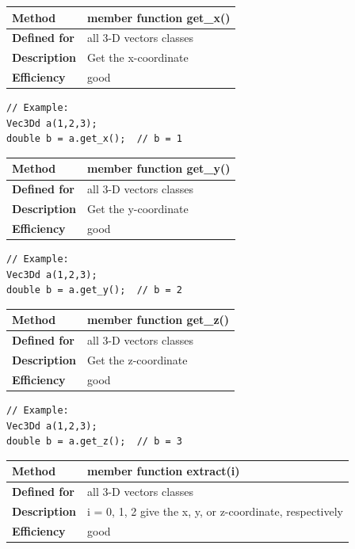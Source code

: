 \documentclass[11pt,a4paper,oneside,openright]{report}
\newcommand{\vspacesmall}{\vspace{3mm}}
\newcommand{\vspacebig}{\vspace{6mm}}
\begin{document}
\begin{tabular}{|p{25mm}|p{100mm}|}
\hline
\bfseries Method & member function get\_x() \\ \hline
\bfseries Defined for & all 3-D vectors classes \\ \hline
\bfseries Description & Get the x-coordinate \\ \hline
\bfseries Efficiency & good \\ \hline
\end{tabular}
\vspacesmall

\begin{lstlisting}[frame=none]
// Example:
Vec3Dd a(1,2,3);
double b = a.get_x();  // b = 1
\end{lstlisting}
\vspacebig

\begin{tabular}{|p{25mm}|p{100mm}|}
\hline
\bfseries Method & member function get\_y() \\ \hline
\bfseries Defined for & all 3-D vectors classes \\ \hline
\bfseries Description & Get the y-coordinate \\ \hline
\bfseries Efficiency & good \\ \hline
\end{tabular}
\vspacesmall

\begin{lstlisting}[frame=none]
// Example:
Vec3Dd a(1,2,3);
double b = a.get_y();  // b = 2
\end{lstlisting}
\vspacebig

\begin{tabular}{|p{25mm}|p{100mm}|}
\hline
\bfseries Method & member function get\_z() \\ \hline
\bfseries Defined for & all 3-D vectors classes \\ \hline
\bfseries Description & Get the z-coordinate \\ \hline
\bfseries Efficiency & good \\ \hline
\end{tabular}
\vspacesmall

\begin{lstlisting}[frame=none]
// Example:
Vec3Dd a(1,2,3);
double b = a.get_z();  // b = 3
\end{lstlisting}
\vspacebig

\begin{tabular}{|p{25mm}|p{100mm}|}
\hline
\bfseries Method & member function extract(i) \\ \hline
\bfseries Defined for & all 3-D vectors classes \\ \hline
\bfseries Description & i = 0, 1, 2 give the x, y, or z-coordinate, respectively \\ \hline
\bfseries Efficiency & good \\ \hline
\end{tabular}
\vspacesmall
\end{document}
